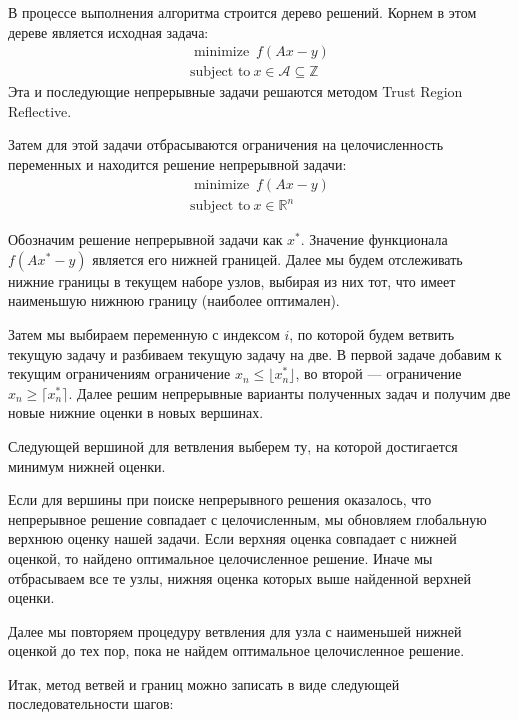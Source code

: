 \documentclass[12pt]{article}
\begin{document}
В процессе выполнения алгоритма строится дерево решений. Корнем в этом дереве является исходная задача:
$$
\begin{gathered}
\operatorname{minimize} \ f(Ax - y) \\
\text{subject to} \ x \in \mathcal{A} \subseteq \mathbb{Z}
\end{gathered}
$$
Эта и последующие непрерывные задачи решаются методом Trust Region Reflective.

Затем для этой задачи отбрасываются ограничения на целочисленность переменных и находится решение непрерывной задачи:
$$
\begin{gathered}
\operatorname{minimize} \ f(Ax - y) \\
\text{subject to} \ x \in \mathbb{R}^n
\end{gathered}
$$

Обозначим решение непрерывной задачи как $x^*$. Значение функционала $f(Ax^* - y)$ является его нижней границей. Далее мы будем отслеживать нижние границы в текущем наборе узлов, выбирая из них тот, что имеет наименьшую нижнюю границу (наиболее оптимален).

Затем мы выбираем переменную с индексом $i$, по которой будем ветвить текущую задачу и разбиваем текущую задачу на две. В первой задаче добавим к текущим ограничениям ограничение $x_n \le \lfloor x_n^* \rfloor$, во второй — ограничение $x_n \ge \lceil x_n^* \rceil$. Далее решим непрерывные варианты полученных задач и получим две новые нижние оценки в новых вершинах.

Следующей вершиной для ветвления выберем ту, на которой достигается минимум нижней оценки.

Если для вершины при поиске непрерывного решения оказалось, что непрерывное решение совпадает с целочисленным, мы обновляем глобальную верхнюю оценку нашей задачи. Если верхняя оценка совпадает с нижней оценкой, то найдено оптимальное целочисленное решение. Иначе мы отбрасываем все те узлы, нижняя оценка которых выше найденной верхней оценки.

Далее мы повторяем процедуру ветвления для узла с наименьшей нижней оценкой до тех пор, пока не найдем оптимальное целочисленное решение.

Итак, метод ветвей и границ можно записать в виде следующей последовательности шагов:
\end{document}

